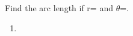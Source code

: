 Find the arc length if r= and $\theta$=\degree.
\newline
\begin{enumerate}
    \item
    \degree
{}
\end{enumerate}